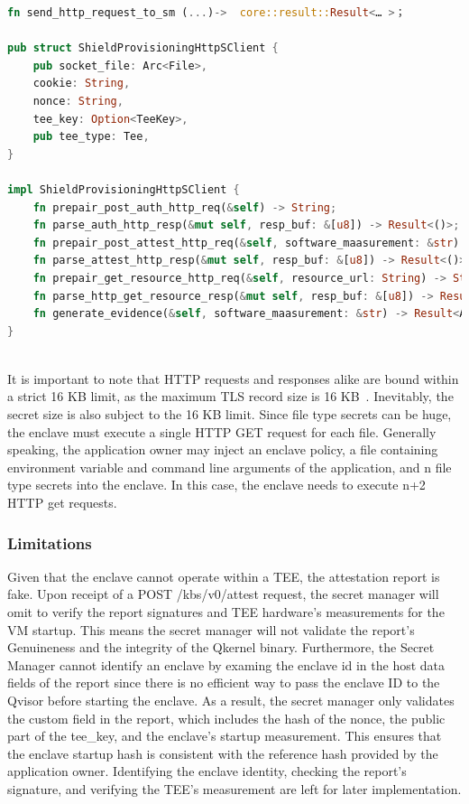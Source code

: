 \begin{lstlisting}[language=rust, caption= Functions for building the HTTP requests defined in the KBS attestation protocol, label={lst:http_connection}]
fn send_http_request_to_sm (...)->  core::result::Result<… >；

pub struct ShieldProvisioningHttpSClient {
    pub socket_file: Arc<File>,
    cookie: String,
    nonce: String,
    tee_key: Option<TeeKey>,
    pub tee_type: Tee,
}

impl ShieldProvisioningHttpSClient {
    fn prepair_post_auth_http_req(&self) -> String;
    fn parse_auth_http_resp(&mut self, resp_buf: &[u8]) -> Result<()>;
    fn prepair_post_attest_http_req(&self, software_maasurement: &str) -> Result<String>;
    fn parse_attest_http_resp(&mut self, resp_buf: &[u8]) -> Result<()>;
    fn prepair_get_resource_http_req(&self, resource_url: String) -> String;
    fn parse_http_get_resource_resp(&mut self, resp_buf: &[u8]) -> Result<Vec<u8>>;
    fn generate_evidence(&self, software_maasurement: &str) -> Result<Attestation>;
}
    
\end{lstlisting}

It is important to note that HTTP requests and responses alike are bound within a strict 16 KB limit, as the maximum TLS record size is 16 KB~\cite*{tls_record_size}. Inevitably, the secret size is also subject to the 16 KB limit. Since file type secrets can be huge, the 
enclave must execute a single HTTP GET request for each file. Generally speaking, the application owner may inject an enclave policy, a file containing environment variable and command line arguments of the application, and n file type secrets into the enclave. 
In this case, the enclave needs to execute n+2 HTTP get requests.

\subsubsection{Limitations}

Given that the enclave cannot operate within a TEE, the attestation report is fake. Upon receipt of a POST /kbs/v0/attest request, the secret manager will omit to verify the report signatures and TEE hardware's measurements for the VM startup. This means the secret manager will not validate the report's 
Genuineness and the integrity of the Qkernel binary. Furthermore, the Secret Manager cannot identify an enclave by examing the enclave id in the host data fields of the report since there is no efficient way to pass the enclave ID to the Qvisor before starting the enclave. As a result, the secret 
manager only validates the custom field in the report, which includes the hash of the nonce, the public part of the tee\_key, and the enclave's startup measurement. This ensures that the enclave startup hash is consistent with the reference hash provided by the application owner. Identifying the enclave 
identity, checking the report's signature, and verifying the TEE's measurement are left for later implementation.


